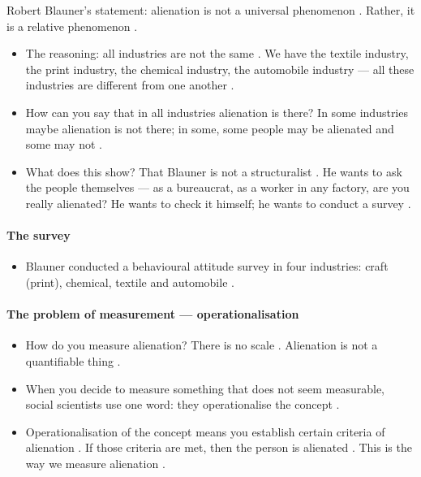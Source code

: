 \begin{KeyConcept}
Robert Blauner's statement: alienation is not a universal phenomenon . Rather, it is a relative phenomenon .
\end{KeyConcept}

\begin{itemize}
    \item The reasoning: all industries are not the same . We have the textile industry, the print industry, the chemical industry, the automobile industry --- all these industries are different from one another .
    \item How can you say that in all industries alienation is there? In some industries maybe alienation is not there; in some, some people may be alienated and some may not .
    \item What does this show? That Blauner is not a structuralist . He wants to ask the people themselves --- as a bureaucrat, as a worker in any factory, are you really alienated? He wants to check it himself; he wants to conduct a survey .
\end{itemize}

\paragraph{The survey}
\begin{itemize}
    \item Blauner conducted a behavioural attitude survey in four industries: craft (print), chemical, textile and automobile .
\end{itemize}

\paragraph{The problem of measurement --- operationalisation}
\begin{itemize}
    \item How do you measure alienation? There is no scale . Alienation is not a quantifiable thing .
    \item When you decide to measure something that does not seem measurable, social scientists use one word: they operationalise the concept .
    \item Operationalisation of the concept means you establish certain criteria of alienation . If those criteria are met, then the person is alienated . This is the way we measure alienation .
\end{itemize}

